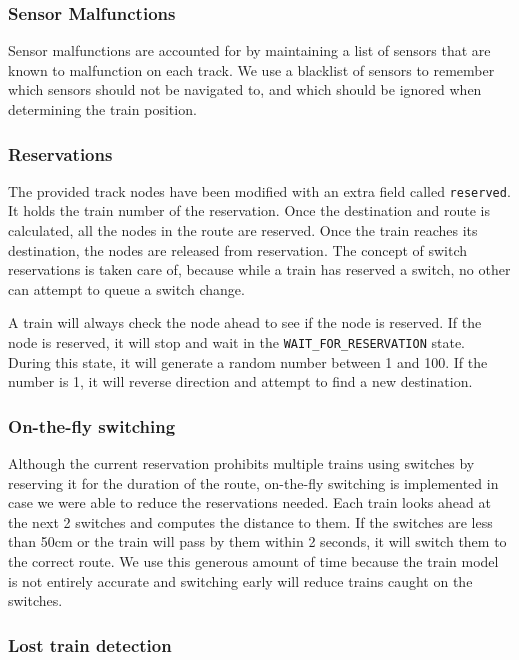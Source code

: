 \documentclass[letterpaper]{article}
\begin{document}
\subsubsection{Sensor Malfunctions%
  \label{sensor-malfunctions}%
}

Sensor malfunctions are accounted for by maintaining a list of sensors that are known to malfunction on each track.  We use a blacklist of sensors to remember which sensors should not be navigated to, and which should be ignored when determining the train position.


\subsubsection{Reservations%
  \label{reservations}%
}

The provided track nodes have been modified with an extra field called \texttt{reserved}. It holds the train number of the reservation. Once the destination and route is calculated, all the nodes in the route are reserved. Once the train reaches its destination, the nodes are released from reservation.  The concept of switch reservations is taken care of, because while a train has reserved a switch, no other can attempt to queue a switch change.

A train will always check the node ahead to see if the node is reserved. If the node is reserved, it will stop and wait in the \texttt{WAIT\_FOR\_RESERVATION} state. During this state, it will generate a random number between 1 and 100. If the number is 1, it will reverse direction and attempt to find a new destination.


\subsubsection{On-the-fly switching%
  \label{on-the-fly-switching}%
}

Although the current reservation prohibits multiple trains using switches by reserving it for the duration of the route, on-the-fly switching is implemented in case we were able to reduce the reservations needed. Each train looks ahead at the next 2 switches and computes the distance to them. If the switches are less than 50cm or the train will pass by them within 2 seconds, it will switch them to the correct route. We use this generous amount of time because the train model is not entirely accurate and switching early will reduce trains caught on the switches.


\subsubsection{Lost train detection%
  \label{lost-train-detection}%
}
\end{document}
